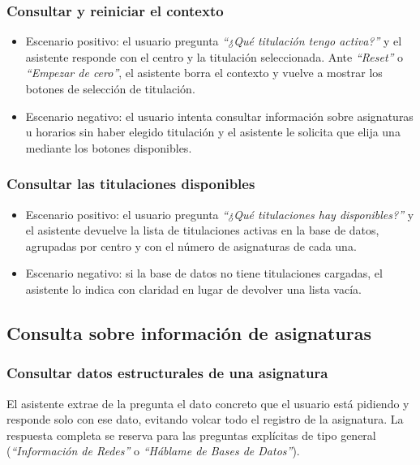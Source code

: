 \subsubsection{Consultar y reiniciar el contexto}

\begin{itemize}
    \item Escenario positivo: el usuario pregunta \textit{``¿Qué titulación tengo activa?''} y el asistente responde con el centro y la titulación seleccionada. Ante \textit{``Reset''} o \textit{``Empezar de cero''}, el asistente borra el contexto y vuelve a mostrar los botones de selección de titulación.
    \item Escenario negativo: el usuario intenta consultar información sobre asignaturas u horarios sin haber elegido titulación y el asistente le solicita que elija una mediante los botones disponibles.
\end{itemize}

\subsubsection{Consultar las titulaciones disponibles}

\begin{itemize}
    \item Escenario positivo: el usuario pregunta \textit{``¿Qué titulaciones hay disponibles?''} y el asistente devuelve la lista de titulaciones activas en la base de datos, agrupadas por centro y con el número de asignaturas de cada una.
    \item Escenario negativo: si la base de datos no tiene titulaciones cargadas, el asistente lo indica con claridad en lugar de devolver una lista vacía.
\end{itemize}

\subsection{Consulta sobre información de asignaturas}

\subsubsection{Consultar datos estructurales de una asignatura}

El asistente extrae de la pregunta el dato concreto que el usuario está pidiendo y responde solo con ese dato, evitando volcar todo el registro de la asignatura. La respuesta completa se reserva para las preguntas explícitas de tipo general (\textit{``Información de Redes''} o \textit{``Háblame de Bases de Datos''}).

